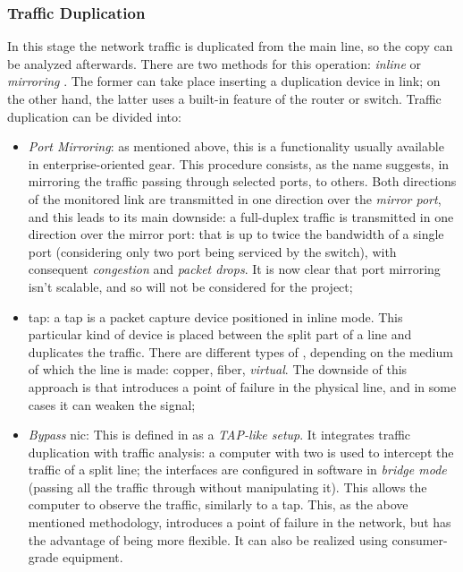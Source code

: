 \subsubsection{Traffic Duplication}
\label{subsubsec:traffic-duplication}

In this stage the network traffic is duplicated from the main line, so the copy can be analyzed afterwards. There are two methods for this operation: \textit{inline} or \textit{mirroring} \cite{Svoboda2015}. The former can take place inserting a duplication device in link; on the other hand, the latter uses a built-in feature of the router or switch. Traffic duplication can be divided into:
\begin{itemize}
    \item[\faCaretRight] \textit{Port Mirroring}: as mentioned above, this is a functionality usually available in enterprise-oriented gear. This procedure consists, as the name suggests, in mirroring the traffic passing through selected ports, to others. Both directions of the monitored link are transmitted in one direction over the \textit{mirror port}, and this leads to its main downside: a full-duplex traffic is transmitted in one direction over the mirror port: that is up to twice the bandwidth of a single port (considering only two port being serviced by the switch), with consequent \textit{congestion} and \textit{packet drops}. It is now clear that port mirroring isn't scalable, and so will not be considered for the project;
    \item[\faCaretRight] \gls{tap}: a \gls{tap} is a packet capture device positioned in inline mode. This particular kind of device is placed between the split part of a line and duplicates the traffic. There are different types of , depending on the medium of which the line is made: copper, fiber, \textit{virtual}. The downside of this approach is that introduces a point of failure in the physical line, and in some cases it can weaken the signal;
    \item[\faCaretRight] \textit{Bypass} \gls{nic}: This is defined in \cite{Svoboda2015} as a \textit{TAP-like setup}. It integrates traffic duplication with traffic analysis: a computer with two  is used to intercept the traffic of a split line; the interfaces are configured in software in \textit{bridge mode} (passing all the traffic through without manipulating it). This allows the computer to observe the traffic, similarly to a \gls{tap}. This, as the above mentioned methodology, introduces a point of failure in the network, but has the advantage of being more flexible. It can also be realized using consumer-grade equipment.
\end{itemize}

